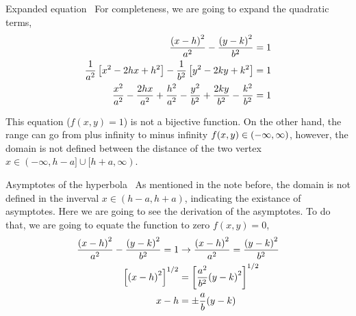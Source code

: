 \documentclass[../main-notes.tex]{subfiles}
\begin{document}
\begin{note}{Expanded equation}{~}
    For completeness, we are going to expand the quadratic terms,
    \begin{align*}
        \frac{\qty(x-h)^2}{a^2} - \frac{\qty(y-k)^2}{b^2} &= 1 \\
        \frac{1}{a^2}\left[x^2-2hx+h^2\right] -\frac{1}{b^2}\left[y^2-2ky+k^2\right] &= 1 \\
        \frac{x^2}{a^2}-\frac{2hx}{a^2}+\frac{h^2}{a^2}  -\frac{y^2}{b^2}+\frac{2ky}{b^2}-\frac{k^2}{b^2} &= 1
    \end{align*}

    This equation ($f(x,y)=1$) is not a bijective function.
    On the other hand, the range can go from plus infinity to minus infinity $f(x,y)\in\qty(-\infty,\infty)$, however, the domain is not defined between the distance of the two vertex $x\in(-\infty,h-a]\cup[h+a,\infty)$.
\end{note}

\begin{note}{Asymptotes of the hyperbola}{~}
    As mentioned in the note before, the domain is not defined in the inverval $x\in(h-a,h+a)$, indicating the existance of asymptotes.
    Here we are going to see the derivation of the asymptotes.
    To do that, we are going to equate the function to zero $f(x,y)=0$,
    \begin{align*}
        \frac{\qty(x-h)^2}{a^2} - \frac{\qty(y-k)^2}{b^2} = 1 &\to\frac{\qty(x-h)^2}{a^2} = \frac{\qty(y-k)^2}{b^2} \\
        \left[\qty(x-h)^2\right]^{1/2} &= \left[\frac{a^2}{b^2}\qty(y-k)^2\right]^{1/2} \\
        x-h &= \pm\frac{a}{b}\qty(y-k) 
    \end{align*}
\end{note}


\end{document}
